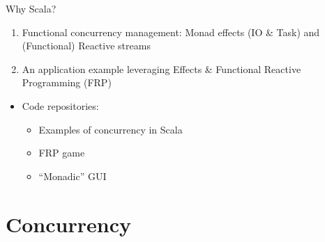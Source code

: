 \documentclass[presentation, 9pt]{beamer}\mode<presentation>{\usetheme{AMSBolognaFC}}
\begin{document}
\begin{frame}{Why Scala?}
\begin{itemize}
\begin{enumerate}
     	\item Functional concurrency management: Monad effects (IO \& Task) and (Functional) Reactive streams 
      \item An application example leveraging Effects \& Functional Reactive Programming (FRP)
		\end{enumerate}
	\end{itemize}
	\begin{itemize}
		\item Code repositories:
		\begin{itemize}
			\item Examples of concurrency in Scala \href{https://github.com/cric96/scala-concurrent-programming}{\faLink}
   		\item FRP game \href{https://github.com/cric96/scala-frp-gui}{\faLink}
     	\item ``Monadic'' GUI \href{https://github.com/cric96/scala-functional-gui}{\faLink}  
		\end{itemize}
	\end{itemize}
 \end{frame}
\section{Concurrency}
\end{document}
